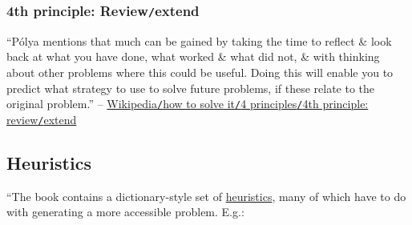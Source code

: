 \documentclass[oneside]{book}
\numberwithin{equation}{section}
\begin{document}
\subsubsection{4th principle: Review\texttt{/}extend}
``P\'olya mentions that much can be gained by taking the time to reflect \& look back at what you have done, what worked \& what did not, \& with thinking about other problems where this could be useful. Doing this will enable you to predict what strategy to use to solve future problems, if these relate to the original problem.'' -- \href{https://en.wikipedia.org/wiki/How_to_Solve_It#Fourth_principle:_Review/extend}{Wikipedia\texttt{/}how to solve it\texttt{/}4 principles\texttt{/}4th principle: review\texttt{/}extend}

\subsection{Heuristics}
``The book contains a dictionary-style set of \href{https://en.wikipedia.org/wiki/Heuristics}{heuristics}, many of which have to do with generating a more accessible problem. E.g.:
\end{document}
